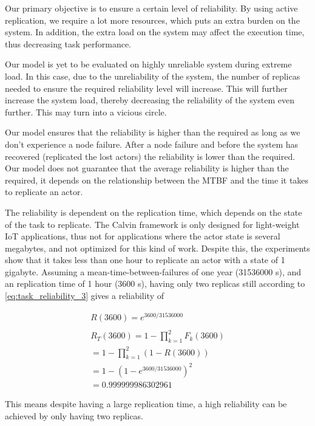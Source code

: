 \documentclass{cslthse-msc}
\begin{document}
Our primary objective is to ensure a certain level of reliability. By using active replication, we require a lot more resources, which puts an extra burden on the system. In addition, the extra load on the system may affect the execution time, thus decreasing task performance.

Our model is yet to be evaluated on highly unreliable system during extreme load. In this case, due to the unreliability of the system, the number of replicas needed to ensure the required reliability level will increase. This will further increase the system load, thereby decreasing the reliability of the system even further. This may turn into a vicious circle.

Our model ensures that the reliability is higher than the required as long as we don't experience a node failure. After a node failure and before the system has recovered (replicated the lost actors) the reliability is lower than the required. Our model does not guarantee that the average reliability is higher than the required, it depends on the relationship between the MTBF and the time it takes to replicate an actor.

The reliability is dependent on the replication time, which depends on the state of the task to replicate. The Calvin framework is only designed for light-weight IoT applications, thus not for applications where the actor state is several megabytes, and not optimized for this kind of work. Despite this, the experiments show that it takes less than one hour to replicate an actor with a state of 1 gigabyte. Assuming a mean-time-between-failures of one year (31536000 s), and an replication time of 1 hour (3600 s), having only two replicas still according to \cref{eq:task_reliability_3} gives a reliability of

\begin{equation*}
\begin{split}
R(3600) = e^{3600/31536000}\\
\\
R_{T}(3600) = 1 - \prod\limits_{k=1}^2 F_{k}(3600)\\
= 1 - \prod\limits_{k=1}^2 (1 - R(3600))\\
= 1 - (1 - e^{3600/31536000})^2\\
= 0.999999986302961
\end{split}
\end{equation*}

This means despite having a large replication time, a high reliability can be achieved by only having two replicas.
\end{document}
